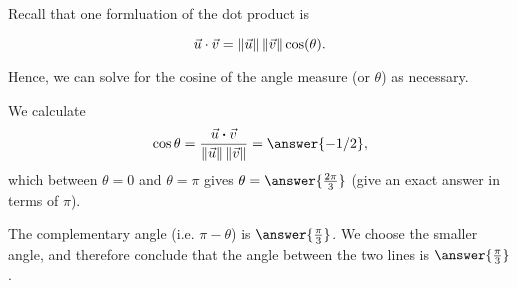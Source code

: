 \documentclass{ximera}
\begin{document}
\begin{example}
  Recall that one formluation of the dot product is 
  
  $$\vec{u}\cdot\vec{v}=\left\|\vec{u}\right\|\left\|\vec{v}\right\|\cos(\theta).$$
  
  Hence, we can solve for the cosine of the angle measure (or $\theta$) as necessary. 
  
  We calculate
  \begin{equation*}
    \cos\theta =
    \frac{\vec{u}\dotprod\vec{v}}{\norm{\vec{u}}\norm{\vec{v}}} = \answer{-1/2},
  \end{equation*}
  which between $\theta=0$ and $\theta=\pi$ gives $\theta=\answer{\frac{2\pi}{3}}$ (give an exact answer in terms of $\pi$).  
  
 The complementary angle (i.e. $\pi-\theta$) is $\answer{\frac{\pi}{3}}$. We
  choose the smaller angle, and therefore conclude that the angle
  between the two lines is $\answer{\frac{\pi}{3}}$.
\end{example}
\end{document}
